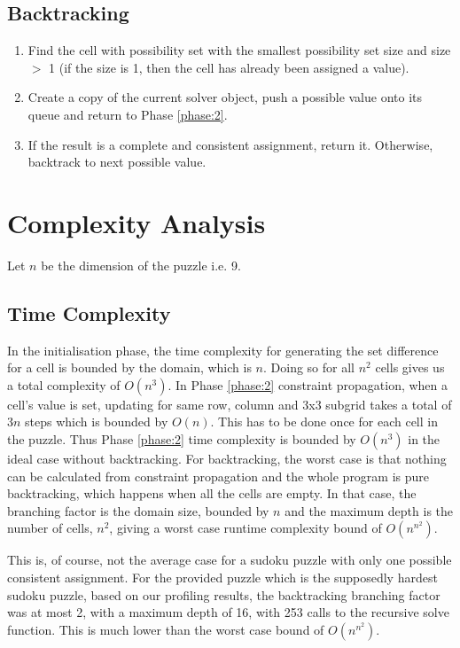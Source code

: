 \documentclass[11pt, a4paper]{article}
\begin{document}
\subsection{Backtracking}
\label{phase:3}
\begin{enumerate}
  \item Find the cell with possibility set with the smallest possibility set size and size $>$ 1 (if the size is 1, then the cell has already been assigned a value).
  \item Create a copy of the current solver object, push a possible value onto its queue and return to Phase \ref{phase:2}.
  \item If the result is a complete and consistent assignment, return it. Otherwise, backtrack to next possible value.
\end{enumerate}

\section{Complexity Analysis}
Let $n$ be the dimension of the puzzle i.e. 9.

\subsection{Time Complexity}
In the initialisation phase, the time complexity for generating the set difference for a cell is bounded by the domain, which is $n$.
Doing so for all $n^2$ cells gives us a total complexity of $O(n^3)$.
In Phase \ref{phase:2} constraint propagation, when a cell's value is set, updating for same row, column and 3x3 subgrid takes a total of $3n$ steps which is bounded by $O(n)$.
This has to be done once for each cell in the puzzle.
Thus Phase \ref{phase:2} time complexity is bounded by $O(n^3)$ in the ideal case without backtracking.
For backtracking, the worst case is that nothing can be calculated from constraint propagation and the whole program is pure backtracking, which happens when all the cells are empty.
In that case, the branching factor is the domain size, bounded by $n$ and the maximum depth is the number of cells, $n^2$, giving a worst case runtime complexity bound of $O(n^{n^2})$.

This is, of course, not the average case for a sudoku puzzle with only one possible consistent assignment.
For the provided puzzle which is the supposedly hardest sudoku puzzle, based on our profiling results, the backtracking branching factor was at most 2, with a maximum depth of 16, with 253 calls to the recursive solve function.
This is much lower than the worst case bound of $O(n^{n^2})$.
\end{document}
